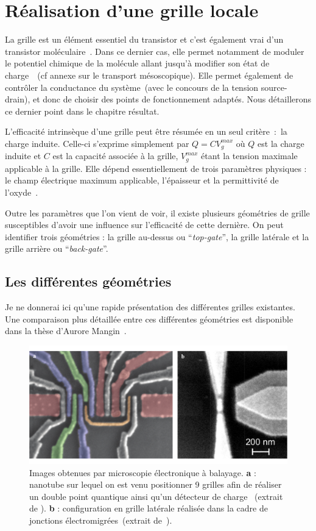 \section{Réalisation d'une grille locale}
La grille est un élément essentiel du transistor et c'est également vrai d'un transistor moléculaire~\cite{Datta2009,Zant2006}. Dans ce dernier cas, elle permet notamment de moduler le potentiel chimique de la molécule allant jusqu'à modifier son état de charge~\cite{Beenakker1991,Wiel2002,Hanson2007}~(cf annexe sur le transport mésoscopique). Elle permet également de contrôler la conductance du système~(avec le concours de la tension source-drain), et donc de choisir des points de fonctionnement adaptés. Nous détaillerons ce dernier point dans le chapitre résultat. 

L'efficacité intrinsèque d'une grille peut être résumée en un seul critère~:~la charge induite. Celle-ci s'exprime simplement par $Q = CV_g^{max}$ où $Q$ est la charge induite et $C$ est la capacité associée à la grille, $V_g^{max}$ étant la tension maximale applicable à la grille. Elle dépend essentiellement de trois paramètres physiques : le champ électrique maximum applicable, l'épaisseur et la permittivité de l'oxyde~\cite{Biercuk2003}. 

Outre les paramètres que l'on vient de voir, il existe plusieurs géométries de grille susceptibles d'avoir une influence sur l’efficacité de cette dernière. On peut identifier trois géométries : la grille au-dessus ou  ``\textit{top-gate}'', la grille latérale et la grille arrière ou  ``\textit{back-gate}''.

\subsection{Les différentes géométries}
Je ne donnerai ici qu'une rapide présentation des différentes grilles existantes. Une comparaison plus détaillée entre ces différentes géométries est disponible dans la thèse d'Aurore Mangin~\cite{Aurore2009}.

\begin{figure}
\centering \includegraphics[scale=0.45]{Fabrication/Gateconf/GateConf.pdf}
\caption{Images obtenues par microscopie électronique à balayage. \textbf{a} : nanotube sur lequel on est venu positionner 9 grilles afin de réaliser un double point quantique ainsi qu'un détecteur de charge ~(extrait de \cite{Churchill2009}). \textbf{b} : configuration en grille latérale réalisée dans la cadre de jonctions électromigrées~(extrait de~\cite{Aurore2009}).}
\label{GateConf}
\end{figure}



